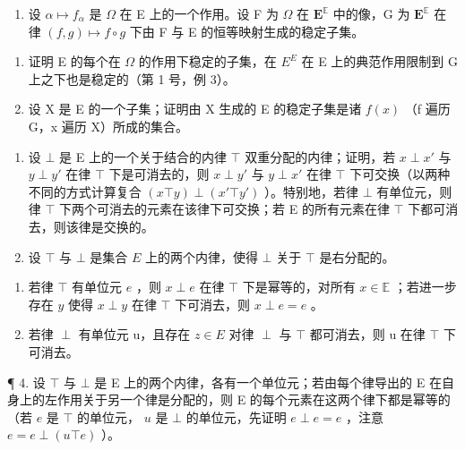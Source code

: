 \BourbakiExercisesSection

\begin{enumerate}
\def\labelenumi{\arabic{enumi}.}
\tightlist
\item
  设 \(\alpha \mapsto f_{\alpha}\) 是 \(\Omega\) 在 E 上的一个作用。设 F 为 \(\Omega\) 在 \(\mathbf{E}^{\mathbb{E}}\) 中的像，G 为 \(\mathbf{E}^{\mathbb{E}}\) 在律 \((f,g) \mapsto f \circ g\) 下由 F 与 E 的恒等映射生成的稳定子集。
\end{enumerate}

\begin{enumerate}
\def\labelenumi{(\alph{enumi})}
\item
  证明 E 的每个在 \(\Omega\) 的作用下稳定的子集，在 \(E^{E}\) 在 E 上的典范作用限制到 G 上之下也是稳定的（第 1 号，例 3）。
\item
  设 X 是 E 的一个子集；证明由 X 生成的 E 的稳定子集是诸 \(f(x)\) （f 遍历 G，x 遍历 X）所成的集合。
\end{enumerate}

\begin{enumerate}
\def\labelenumi{\arabic{enumi}.}
\setcounter{enumi}{1}
\item
  设 \(\bot\) 是 E 上的一个关于结合的内律 \(\top\) 双重分配的内律；证明，若 \(x \perp x'\) 与 \(y \perp y'\) 在律 \(\top\) 下是可消去的，则 \(x \perp y'\) 与 \(y \perp x'\) 在律 \(\top\) 下可交换（以两种不同的方式计算复合 \((x \top y) \perp (x' \top y')\) ）。特别地，若律 \(\bot\) 有单位元，则律 \(\top\) 下两个可消去的元素在该律下可交换；若 E 的所有元素在律 \(\top\) 下都可消去，则该律是交换的。
\item
  设 \(\top\) 与 \(\bot\) 是集合 \(E\) 上的两个内律，使得 \(\bot\) 关于 \(\top\) 是右分配的。
\end{enumerate}

\begin{enumerate}
\def\labelenumi{(\alph{enumi})}
\item
  若律 \(\top\) 有单位元 \(e\) ，则 \(x \perp e\) 在律 \(\top\) 下是幂等的，对所有 \(x \in \mathbb{E}\) ；若进一步存在 \(y\) 使得 \(x \perp y\) 在律 \(\top\) 下可消去，则 \(x \perp e = e\) 。
\item
  若律 \(\perp\) 有单位元 u，且存在 \(z \in E\) 对律 \(\perp\) 与 \(\top\) 都可消去，则 u 在律 \(\top\) 下可消去。
\end{enumerate}

¶ 4. 设 \(\top\) 与 \(\bot\) 是 E 上的两个内律，各有一个单位元；若由每个律导出的 E 在自身上的左作用关于另一个律是分配的，则 E 的每个元素在这两个律下都是幂等的（若 \(e\) 是 \(\top\) 的单位元， \(u\) 是 \(\bot\) 的单位元，先证明 \(e \perp e = e\) ，注意 \(e = e \perp (u \top e)\) ）。


